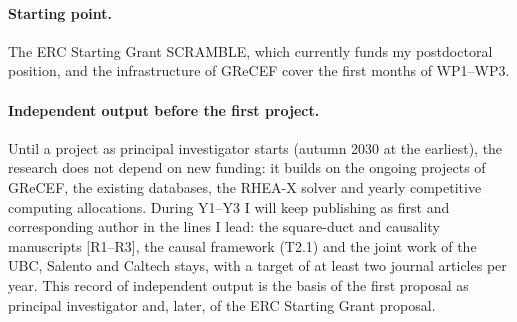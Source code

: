 \documentclass[11pt]{article}
\begin{document}
\paragraph{Starting point.} The ERC Starting Grant SCRAMBLE, which currently funds my
postdoctoral position, and the infrastructure of GReCEF cover the first months of WP1--WP3.

\paragraph{Independent output before the first project.} Until a project as principal
investigator starts (autumn 2030 at the earliest), the research does not depend on new funding: it
builds on the ongoing projects of GReCEF, the existing databases, the RHEA-X solver and yearly
competitive computing allocations. During Y1--Y3 I will keep publishing as first and corresponding author in the
lines I lead: the square-duct and causality manuscripts [R1--R3], the causal framework
(T2.1) and the joint work of the UBC, Salento and Caltech stays, with a target of at least two journal
articles per year. This record of independent output is the basis of the first proposal as
principal investigator and, later, of the ERC Starting Grant proposal.
\end{document}
